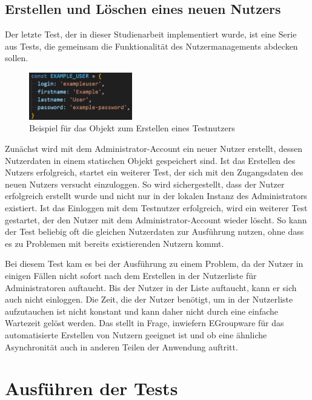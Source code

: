 \newpage
\subsection*{Erstellen und Löschen eines neuen Nutzers}

Der letzte Test, der in dieser Studienarbeit implementiert wurde, ist eine Serie aus Tests, die gemeinsam die Funktionalität des Nutzermanagements abdecken sollen.
\begin{figure}[H]
    \centering
    \includegraphics[width=0.4\textwidth]{images/Exampleuser.png}
    \caption{Beispiel für das Objekt zum Erstellen eines Testnutzers}
    \label{fig:example-user}
\end{figure}
Zunächst wird mit dem Administrator-Account ein neuer Nutzer erstellt, dessen Nutzerdaten in einem statischen Objekt gespeichert sind.
Ist das Erstellen des Nutzers erfolgreich, startet ein weiterer Test, der sich mit den Zugangsdaten des neuen Nutzers versucht einzuloggen.
So wird sichergestellt, dass der Nutzer erfolgreich erstellt wurde und nicht nur in der lokalen Instanz des Administrators existiert.
Ist das Einloggen mit dem Testnutzer erfolgreich, wird ein weiterer Test gestartet, der den Nutzer mit dem Administrator-Account wieder löscht.
So kann der Test beliebig oft die gleichen Nutzerdaten zur Ausführung nutzen, ohne dass es zu Problemen mit bereits existierenden Nutzern kommt.

Bei diesem Test kam es bei der Ausführung zu einem Problem, da der Nutzer in einigen Fällen nicht sofort nach dem Erstellen in der Nutzerliste für Administratoren auftaucht.
Bis der Nutzer in der Liste auftaucht, kann er sich auch nicht einloggen.
Die Zeit, die der Nutzer benötigt, um in der Nutzerliste aufzutauchen ist nicht konstant und kann daher nicht durch eine einfache Wartezeit gelöst werden.
Das stellt in Frage, inwiefern EGroupware für das automatisierte Erstellen von Nutzern geeignet ist und ob eine ähnliche Asynchronität auch in anderen Teilen der Anwendung auftritt.

\section{Ausführen der Tests}

